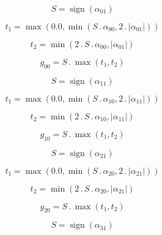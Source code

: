 \documentclass{article}
\begin{document}
\begin{dmath}S = \operatorname{sign}{\left (\alpha_{01} \right )}\end{dmath}

\begin{dmath}t_{1} = \max\left(0.0, \min\left(S \,.\, \alpha_{00}, 2 \,.\, \left|{\alpha_{01}}\right|\right)\right)\end{dmath}

\begin{dmath}t_{2} = \min\left(2 \,.\, S \,.\, \alpha_{00}, \left|{\alpha_{01}}\right|\right)\end{dmath}

\begin{dmath}g_{00} = S \,.\, \max\left(t_{1}, t_{2}\right)\end{dmath}

\begin{dmath}S = \operatorname{sign}{\left (\alpha_{11} \right )}\end{dmath}

\begin{dmath}t_{1} = \max\left(0.0, \min\left(S \,.\, \alpha_{10}, 2 \,.\, \left|{\alpha_{11}}\right|\right)\right)\end{dmath}

\begin{dmath}t_{2} = \min\left(2 \,.\, S \,.\, \alpha_{10}, \left|{\alpha_{11}}\right|\right)\end{dmath}

\begin{dmath}g_{10} = S \,.\, \max\left(t_{1}, t_{2}\right)\end{dmath}

\begin{dmath}S = \operatorname{sign}{\left (\alpha_{21} \right )}\end{dmath}

\begin{dmath}t_{1} = \max\left(0.0, \min\left(S \,.\, \alpha_{20}, 2 \,.\, \left|{\alpha_{21}}\right|\right)\right)\end{dmath}

\begin{dmath}t_{2} = \min\left(2 \,.\, S \,.\, \alpha_{20}, \left|{\alpha_{21}}\right|\right)\end{dmath}

\begin{dmath}g_{20} = S \,.\, \max\left(t_{1}, t_{2}\right)\end{dmath}

\begin{dmath}S = \operatorname{sign}{\left (\alpha_{31} \right )}\end{dmath}
\end{document}
